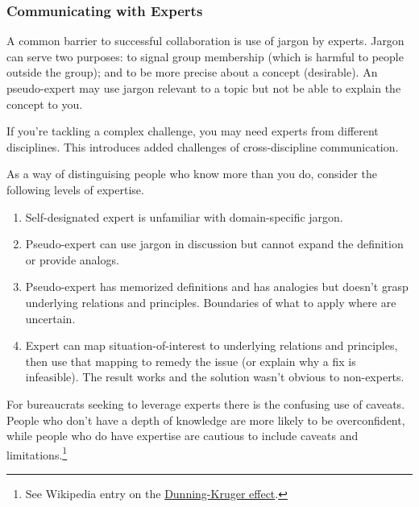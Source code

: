 \subsubsection*{Communicating with Experts}
A common barrier to successful collaboration is use of jargon by experts.
Jargon can serve two purposes: to signal group membership (which is harmful to people outside the group); and to be more precise about a concept (desirable). An pseudo-expert may use jargon relevant to a topic but not be able to explain the concept to you.

If you're tackling a complex challenge, you may need experts from different disciplines. This introduces added challenges of cross-discipline communication. 

As a way of distinguising people who know more than you do, consider the following levels of expertise.
\begin{enumerate}
    \item Self-designated expert is unfamiliar with domain-specific jargon.
    \item Pseudo-expert can use jargon in discussion but cannot expand the definition or provide analogs.
    \item Pseudo-expert has memorized definitions and has analogies but doesn't grasp underlying relations and principles. Boundaries of what to apply where are uncertain.
    \item Expert can map situation-of-interest to underlying relations and principles, then use that mapping to remedy the issue (or explain why a fix is infeasible). The result works and the solution wasn't obvious to non-experts.
\end{enumerate}

For bureaucrats seeking to leverage experts there is the confusing use of caveats. People who don't have a depth of knowledge are more likely to be overconfident, while people who do have expertise are cautious to include caveats and limitations.\footnote{See Wikipedia entry on the \href{https://en.wikipedia.org/wiki/Dunning\%E2\%80\%93Kruger_effect}{Dunning-Kruger effect}.
}


